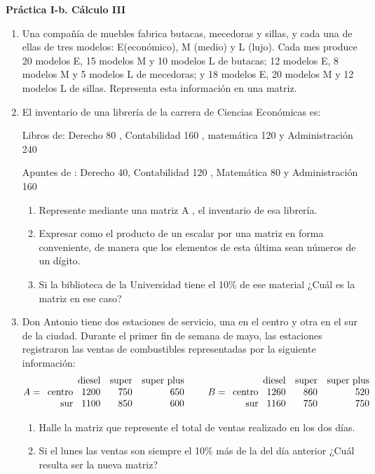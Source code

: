 \documentclass[12pt]{article}
\begin{document}
\begin{center}
    {\Large \bf Práctica I-b. Cálculo III}
\end{center}

\begin{enumerate}
  \item Una compañía de muebles fabrica butacas, mecedoras y sillas, y cada una de ellas de tres modelos: E(económico), M (medio) y L (lujo). Cada mes produce 20 modelos E, 15 modelos M y 10 modelos L de butacas; 12 modelos E, 8 modelos M y 5 modelos L de mecedoras; y 18 modelos E, 20 modelos M y 12 modelos L de sillas. Representa esta información en una matriz.
  \item El inventario de una librería de la carrera de Ciencias Económicas es:

Libros de: Derecho 80 , Contabilidad 160 , matemática 120 y Administración 240

Apuntes de : Derecho 40, Contabilidad 120 , Matemática 80 y Administración 160
\begin{enumerate}
  \item Represente mediante una matriz A , el inventario de esa librería.
  \item Expresar como el producto de un escalar por una matriz en forma conveniente, de manera que los elementos de esta última sean números de un dígito.
  \item Si la biblioteca de la Universidad tiene el 10\% de ese material ¿Cuál es la matriz en ese caso?
\end{enumerate}
\item Don Antonio tiene dos estaciones de servicio, una en el centro y otra en el sur de la ciudad. Durante el primer fin de semana de mayo, las estaciones registraron las ventas de combustibles representadas por la siguiente información:
\[
A =
\begin{array}{r@{\hspace{0.5em}}r r r} %
\multicolumn{1}{c}{} & \text{diesel} & \text{super} & \text{super plus} \\ %
\text{centro} & 1200 & 750 & 650 \\
\text{sur} & 1100 & 850 & 600
\end{array}
\qquad
B =
\begin{array}{r@{\hspace{0.5em}}r r r} %
\multicolumn{1}{c}{} & \text{diesel} & \text{super} & \text{super plus} \\ %
\text{centro} & 1260 & 860 & 520 \\
\text{sur} & 1160 & 750 & 750
\end{array}
\]
\begin{enumerate}
  \item Halle la matriz que represente el total de ventas realizado en los dos días.
  \item Si el lunes las ventas son siempre el 10\% más de la del día anterior ¿Cuál resulta ser la nueva matriz?
\end{enumerate}


\end{enumerate}
\end{document}
